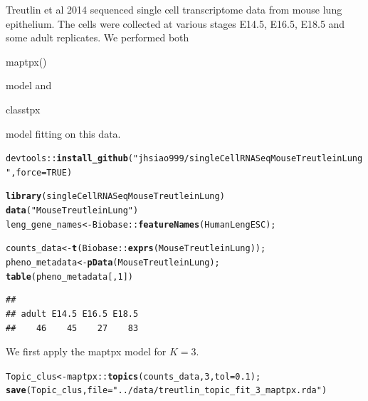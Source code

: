 \documentclass[12pt]{article}\usepackage[]{graphicx}\usepackage[usenames,dvipsnames]{color}
\makeatletter
\newcommand{\hlnum}[1]{\textcolor[rgb]{0.686,0.059,0.569}{#1}}%
\newcommand{\hlstr}[1]{\textcolor[rgb]{0.192,0.494,0.8}{#1}}%
\newcommand{\hlopt}[1]{\textcolor[rgb]{0,0,0}{#1}}%
\newcommand{\hlstd}[1]{\textcolor[rgb]{0.345,0.345,0.345}{#1}}%
\newcommand{\hlkwb}[1]{\textcolor[rgb]{0.69,0.353,0.396}{#1}}%
\newcommand{\hlkwc}[1]{\textcolor[rgb]{0.333,0.667,0.333}{#1}}%
\newcommand{\hlkwd}[1]{\textcolor[rgb]{0.737,0.353,0.396}{\textbf{#1}}}%
\newenvironment{kframe}{%
 \def\at@end@of@kframe{}%
 \ifinner\ifhmode%
  \def\at@end@of@kframe{\end{minipage}}%
  \begin{minipage}{\columnwidth}%
 \fi\fi%
 \def\FrameCommand##1{\hskip\@totalleftmargin \hskip-\fboxsep
 \colorbox{shadecolor}{##1}\hskip-\fboxsep
     \hskip-\linewidth \hskip-\@totalleftmargin \hskip\columnwidth}%
 \MakeFramed {\advance\hsize-\width
   \@totalleftmargin\z@ \linewidth\hsize
   \@setminipage}}%
 {\par\unskip\endMakeFramed%
 \at@end@of@kframe}
\newenvironment{knitrout}{}{} %
\makeatother
\begin{document}
Treutlin et al 2014 sequenced single cell transcriptome data from mouse lung epithelium. The cells were collected at various stages E14.5, E16.5, E18.5 and some adult replicates. We performed both \begin{verb} maptpx() \end{verb} model and \begin{verb} classtpx \end{verb} model fitting on this data.

\begin{knitrout}
\color{fgcolor}\begin{kframe}
\begin{alltt}
\hlstd{devtools}\hlopt{::}\hlkwd{install_github}\hlstd{(}\hlstr{"jhsiao999/singleCellRNASeqMouseTreutleinLung"}\hlstd{,} \hlkwc{force}\hlstd{=}\hlnum{TRUE}\hlstd{)}
\end{alltt}
\end{kframe}
\end{knitrout}

\begin{knitrout}
\color{fgcolor}\begin{kframe}
\begin{alltt}
\hlkwd{library}\hlstd{(singleCellRNASeqMouseTreutleinLung)}
\hlkwd{data}\hlstd{(}\hlstr{"MouseTreutleinLung"}\hlstd{)}
\hlstd{leng_gene_names} \hlkwb{<-} \hlstd{Biobase}\hlopt{::}\hlkwd{featureNames}\hlstd{(HumanLengESC);}

\hlstd{counts_data} \hlkwb{<-} \hlkwd{t}\hlstd{(Biobase}\hlopt{::}\hlkwd{exprs}\hlstd{(MouseTreutleinLung));}
\hlstd{pheno_metadata} \hlkwb{<-} \hlkwd{pData}\hlstd{(MouseTreutleinLung);}
\hlkwd{table}\hlstd{(pheno_metadata[,}\hlnum{1}\hlstd{])}
\end{alltt}
\begin{verbatim}
## 
## adult E14.5 E16.5 E18.5 
##    46    45    27    83
\end{verbatim}
\end{kframe}
\end{knitrout}

We first apply the maptpx model for $K=3$.

\begin{knitrout}
\color{fgcolor}\begin{kframe}
\begin{alltt}
\hlstd{Topic_clus} \hlkwb{<-} \hlstd{maptpx}\hlopt{::}\hlkwd{topics}\hlstd{(counts_data,} \hlnum{3}\hlstd{,} \hlkwc{tol}\hlstd{=}\hlnum{0.1}\hlstd{);}
\hlkwd{save}\hlstd{(Topic_clus,} \hlkwc{file}\hlstd{=}\hlstr{"../data/treutlin_topic_fit_3_maptpx.rda"}\hlstd{)}
\end{alltt}
\end{kframe}
\end{knitrout}
\end{document}

